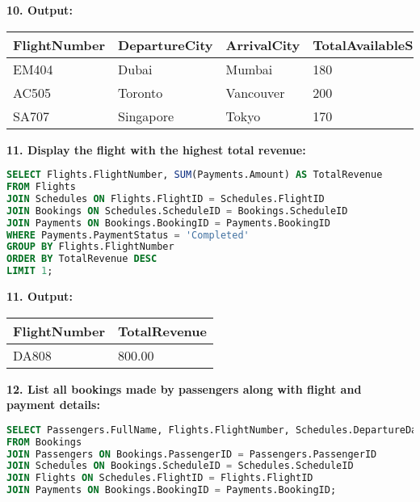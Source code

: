 \documentclass[14pt,a4paper]{extarticle}
\begin{document}
    \textbf{10. Output:}
\begin{table}[h!]
\centering
\begin{tabular}{|l|l|l|l|}
\hline
\textbf{FlightNumber} & \textbf{DepartureCity} & \textbf{ArrivalCity} & \textbf{TotalAvailableSeats} \\ \hline
EM404                 & Dubai                  & Mumbai               & 180                         \\ \hline
AC505                 & Toronto                & Vancouver            & 200                         \\ \hline
SA707                 & Singapore              & Tokyo                & 170                         \\ \hline
\end{tabular}
\end{table}

\newpage

    \textbf{11. Display the flight with the highest total revenue:}
    \begin{lstlisting}[language=SQL, upquote=true]
SELECT Flights.FlightNumber, SUM(Payments.Amount) AS TotalRevenue
FROM Flights
JOIN Schedules ON Flights.FlightID = Schedules.FlightID
JOIN Bookings ON Schedules.ScheduleID = Bookings.ScheduleID
JOIN Payments ON Bookings.BookingID = Payments.BookingID
WHERE Payments.PaymentStatus = 'Completed'
GROUP BY Flights.FlightNumber
ORDER BY TotalRevenue DESC
LIMIT 1;
    \end{lstlisting}
    
    \textbf{11. Output:}
\begin{table}[h!]
\centering
\begin{tabular}{|l|l|}
\hline
\textbf{FlightNumber} & \textbf{TotalRevenue} \\ \hline
DA808                 & 800.00                \\ \hline
\end{tabular}
\end{table}

    \textbf{12. List all bookings made by passengers along with flight and payment details:}
    \begin{lstlisting}[language=SQL, upquote=true]
SELECT Passengers.FullName, Flights.FlightNumber, Schedules.DepartureDate, Payments.Amount, Payments.PaymentStatus
FROM Bookings
JOIN Passengers ON Bookings.PassengerID = Passengers.PassengerID
JOIN Schedules ON Bookings.ScheduleID = Schedules.ScheduleID
JOIN Flights ON Schedules.FlightID = Flights.FlightID
JOIN Payments ON Bookings.BookingID = Payments.BookingID;
    \end{lstlisting}
    
\end{document}
